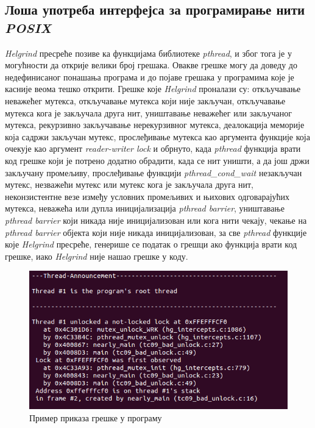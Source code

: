 \documentclass[12pt,oneside]{memoir}
\begin{document}
\subsection{Лоша употреба интерфејса за програмирање нити \textit{POSIX}}

\indent \textit{Helgrind} пресреће позиве ка функцијама библиотеке \textit{pthread}, и због тога је у могућности да открије велики број грешака. Овакве грешке могу да доведу до недефинисаног понашања програма и до појаве грешака у програмима које је касније веома тешко открити. Грешке које \textit{Helgrind} проналази су: откључавање неважећег мутекса, откључавање мутекса који није закључан, откључавање мутекса кога је закључала друга нит, уништавање неважећег или закључаног мутекса, рекурзивно закључавање нерекурзивног мутекса, деалокација меморије која садржи закључан мутекс, прослеђивање мутекса као аргумента функције која очекује као аргумент  \textit{reader-writer lock} и обрнуто, када \textit{pthread} функција врати код грешке који је потрено додатно обрадити, када се нит уништи, а да још држи закључану промељиву, прослеђивање функцији \textit{pthread\_cond\_wait} незакључан мутекс, незважећи мутекс или мутекс кога је закључала друга нит, неконзистентне везе између условних промељивих и њихових одговарајућих мутекса, неважећа или дупла иницијализација \textit{pthread barrier}, уништавање \textit{pthread barrier} који никада није иницијализован или кога нити чекају, чекање на \textit{pthread barrier} објекта који није никада иницијализован, за све \textit{pthread} функције које \textit{Helgrind} пресреће, генерише се податак о грешци ако функција врати код грешке, иако \textit{Helgrind} није нашао грешке у коду.

\begin{figure}[h!]
\begin{center}
\includegraphics[scale=0.75]{slika13.png}
\end{center}
\caption{Пример приказа грешке у програму}
\label{fig:helgrind}
\end{figure}
\end{document}

